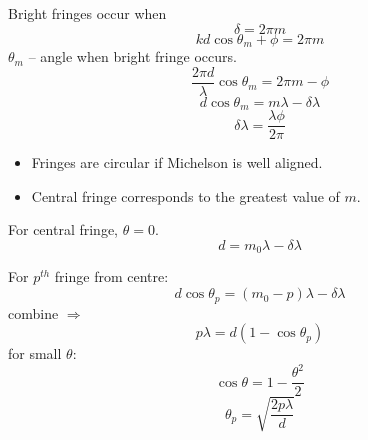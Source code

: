 \documentclass[10pt]{article}
\begin{document}
Bright fringes occur when
\begin{equation*}
\delta = 2\pi m
\end{equation*}
\begin{equation*}
kd\cos{\theta_m} + \phi = 2\pi m
\end{equation*}
$\theta_m$ -- angle when bright fringe occurs.
\begin{equation*}
\frac{2\pi d}{\lambda}\cos{\theta_m} = 2\pi m - \phi
\end{equation*}
\begin{equation*}
d\cos{\theta_m} = m\lambda - \delta \lambda
\end{equation*}
\begin{equation*}
\delta \lambda = \frac{\lambda \phi}{2 \pi}
\end{equation*}
\begin{itemize}
\item Fringes are circular if Michelson is well aligned.
\item Central fringe corresponds to the greatest value of $m$.
\end{itemize}

For central fringe, $\theta = 0$.
\begin{equation*}
d = m_0\lambda - \delta \lambda
\end{equation*}

For $p^{th}$ fringe from centre:
\begin{equation*}
d\cos{\theta_p} = (m_0 - p)\lambda - \delta \lambda
\end{equation*}
combine $\Rightarrow$
\begin{equation*}
p \lambda = d(1 - \cos{\theta_p})
\end{equation*}
for small $\theta$:
\begin{equation*}
\cos{\theta} = 1 - \frac{\theta^2}{2}
\end{equation*}
\begin{equation}\boxed{
\theta_p = \sqrt{\frac{2p\lambda}{d}}
}\end{equation}
\end{document}
